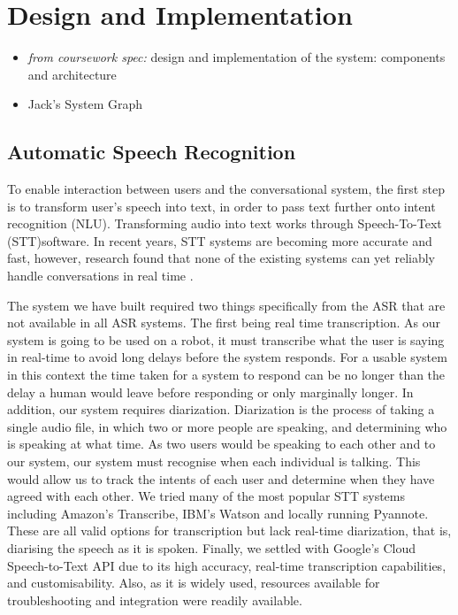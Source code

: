 \documentclass[hidelinks, 11pt]{article}
\begin{document}
\section{Design and Implementation}
\label{sec:implementation}

\begin{itemize}
  \item \textit{from coursework spec:} design and implementation of the system: components and architecture
  \item Jack's System Graph
\end{itemize}

\subsection{Automatic Speech Recognition}
\label{subsec:asr}

To enable interaction between users and the conversational system, the first step is to transform user's speech into text, in order to pass text further onto intent recognition (NLU). Transforming audio into text works through Speech-To-Text (STT)software. In recent years, STT systems are becoming more accurate and fast, however, research found that none of the existing systems can yet reliably handle conversations in real time \cite{Addlesee_Yu_Eshghi_2020}.

The system we  have built required two things specifically from the ASR that are not available in all ASR systems. The first being real time transcription. As our system is going to be used on a robot, it must transcribe what the user is saying in real-time to avoid long delays before the system responds. For a usable system in this context the time taken for a system to respond can be no longer than the delay a human would leave before responding or only marginally longer. In addition, our system requires diarization. Diarization is the process of taking a single audio file, in which two or more people are speaking, and determining who is speaking at what time. As two users would be speaking to each other and to our system, our system must recognise when each individual is talking.  This would allow us to track the intents of each user and determine when they have agreed with each other.
We tried many of the most popular STT systems including Amazon's Transcribe, IBM's Watson and locally running Pyannote. These are all valid options for transcription but lack real-time diarization, that is, diarising the speech as it is spoken.
Finally, we  settled with Google's Cloud Speech-to-Text API due to its high accuracy, real-time transcription capabilities, and customisability. Also, as it is widely used, resources available for troubleshooting and integration were readily available.
\end{document}
